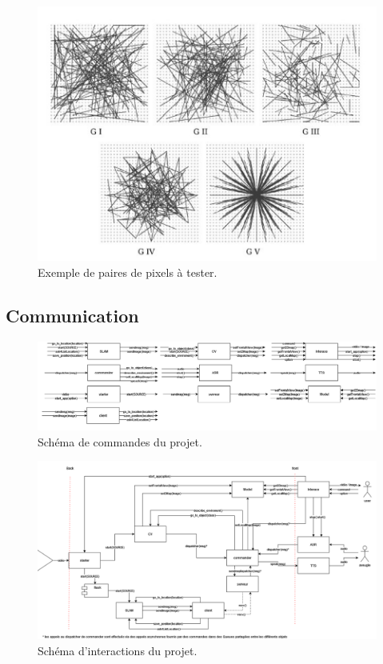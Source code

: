 \documentclass[11pt]{article}
\begin{document}
      \begin{figure}[hbt]  
        \includegraphics[width=\textwidth]{Paires.png}    
        \caption{Exemple de paires de pixels à tester.}
        \label{fig:Paires}
      \end{figure}          
      
    \clearpage

    \subsection*{Communication}    
      \begin{figure}[hbt]  
        \includegraphics[width=\textwidth]{Schéma1.png}    
        \caption{Schéma de commandes du projet.}
        \label{fig:Schema1}
      \end{figure} 
      
      \begin{figure}[hbt]  
        \includegraphics[width=\textwidth]{Schéma2.png}    
        \caption{Schéma d'interactions du projet.}
        \label{fig:Schema2}
      \end{figure}

    \clearpage
    \printnoidxglossary[type=acronym, nonumberlist]
    \printacronyms
 
\end{document}
